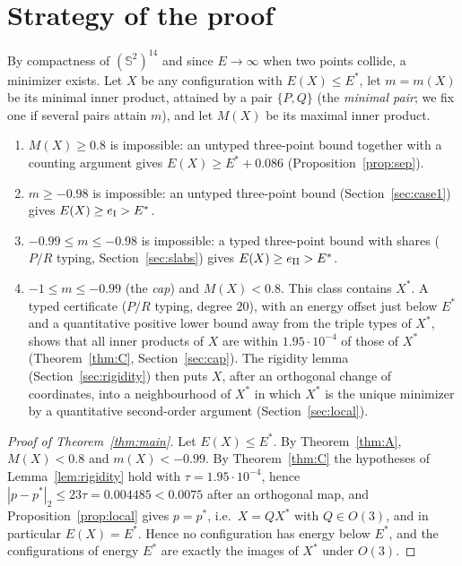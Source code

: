 \documentclass[11pt]{article}
\theoremstyle{definition}
\newcommand{\Sph}{\mathbb{S}^2}
\newcommand{\Xs}{X^{\ast}}
\newcommand{\Es}{E^{\ast}}
\newcommand{\TUBE}{1.95\cdot10^{-4}}        %
\begin{document}
\section{Strategy of the proof}\label{sec:strategy}
By compactness of $(\Sph)^{14}$ and since $E\to\infty$ when two points collide, a minimizer exists. Let $X$ be any
configuration with $E(X)\le\Es$, let $m=m(X)$ be its minimal inner product, attained by a pair $\{P,Q\}$ (the
\emph{minimal pair}; we fix one if several pairs attain $m$), and let $M(X)$ be its maximal inner product.
\begin{enumerate}[label=(\Roman*)]
\item[(0)] $M(X)\ge0.8$ is impossible: an untyped three-point bound together with a counting argument gives
      $E(X)\ge\Es+0.086$ (Proposition~\ref{prop:sep}).
\item $m\ge-0.98$ is impossible: an untyped three-point bound (Section~\ref{sec:case1}) gives $E(X)\ge e_{\rm I}>\Es$.
\item $-0.99\le m\le-0.98$ is impossible: a typed three-point bound with shares ($P/R$ typing,
      Section~\ref{sec:slabs}) gives $E(X)\ge e_{\rm II}>\Es$.
\item $-1\le m\le-0.99$ (the \emph{cap}) and $M(X)<0.8$. This class contains $\Xs$.
      A typed certificate ($P/R$ typing, degree $20$), with an energy offset just below $\Es$ and a quantitative
      positive lower bound away from the triple types of $\Xs$, shows that
      all inner products of $X$ are within $\TUBE$ of those of $\Xs$ (Theorem~\ref{thm:C}, Section~\ref{sec:cap}).
      The rigidity lemma (Section~\ref{sec:rigidity}) then puts $X$, after an orthogonal change of coordinates, into a
      neighbourhood of $\Xs$ in which $\Xs$ is the unique minimizer by a quantitative second-order argument
      (Section~\ref{sec:local}).
\end{enumerate}
\begin{proof}[Proof of Theorem~\ref{thm:main}]
Let $E(X)\le\Es$. By Theorem~\ref{thm:A}, $M(X)<0.8$ and $m(X)<-0.99$. By Theorem~\ref{thm:C} the hypotheses of
Lemma~\ref{lem:rigidity} hold with $\tau=\TUBE$, hence $|p-p^\ast|_2\le23\tau=0.004485<0.0075$ after an
orthogonal map, and Proposition~\ref{prop:local} gives $p=p^\ast$, i.e.\ $X=Q\Xs$ with $Q\in O(3)$, and in particular
$E(X)=\Es$. Hence no configuration has energy below $\Es$, and the configurations of energy $\Es$ are exactly the images
of $\Xs$ under $O(3)$.
\end{proof}
\end{document}

